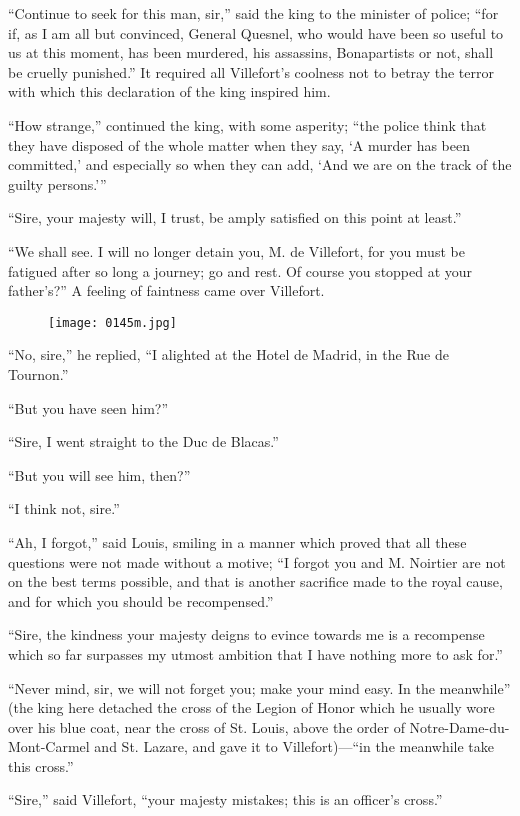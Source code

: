 “Continue to seek for this man, sir,” said the king to the minister of
police; “for if, as I am all but convinced, General Quesnel, who would
have been so useful to us at this moment, has been murdered, his
assassins, Bonapartists or not, shall be cruelly punished.” It required
all Villefort’s coolness not to betray the terror with which this
declaration of the king inspired him.

“How strange,” continued the king, with some asperity; “the police
think that they have disposed of the whole matter when they say, ‘A
murder has been committed,’ and especially so when they can add, ‘And
we are on the track of the guilty persons.’”

“Sire, your majesty will, I trust, be amply satisfied on this point at
least.”

“We shall see. I will no longer detain you, M. de Villefort, for you
must be fatigued after so long a journey; go and rest. Of course you
stopped at your father’s?” A feeling of faintness came over Villefort.

\begin{figure}[h]
\texttt{[image: 0145m.jpg]}
\end{figure}

“No, sire,” he replied, “I alighted at the Hotel de Madrid, in the Rue
de Tournon.”

“But you have seen him?”

“Sire, I went straight to the Duc de Blacas.”

“But you will see him, then?”

“I think not, sire.”

“Ah, I forgot,” said Louis, smiling in a manner which proved that all
these questions were not made without a motive; “I forgot you and M.
Noirtier are not on the best terms possible, and that is another
sacrifice made to the royal cause, and for which you should be
recompensed.”

“Sire, the kindness your majesty deigns to evince towards me is a
recompense which so far surpasses my utmost ambition that I have
nothing more to ask for.”

“Never mind, sir, we will not forget you; make your mind easy. In the
meanwhile” (the king here detached the cross of the Legion of Honor
which he usually wore over his blue coat, near the cross of St. Louis,
above the order of Notre-Dame-du-Mont-Carmel and St. Lazare, and gave
it to Villefort)—“in the meanwhile take this cross.”

“Sire,” said Villefort, “your majesty mistakes; this is an officer’s
cross.”

